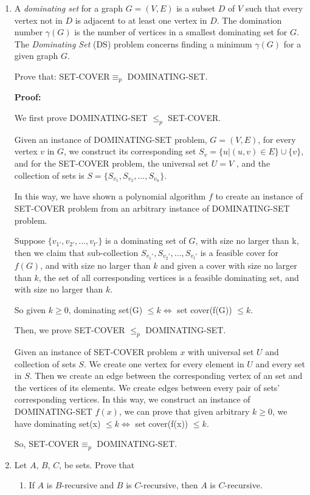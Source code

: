 \documentclass[12pt,a4paper]{article}
\theoremstyle{definition}
\numberwithin{equation}{section}
\numberwithin{figure}{section}
\begin{document}
\begin{enumerate}
  \item A \emph{dominating set} for a graph $G=(V,E)$ is a subset $D$ of $V$ such that every vertex not in $D$ is adjacent to at least one vertex in $D$. The domination number $\gamma(G)$ is the number of vertices in a smallest dominating set for $G$. The \emph{Dominating Set} (DS) problem concerns finding a minimum $\gamma(G)$ for a given graph $G$.

    Prove that: SET-COVER$\equiv_p$ DOMINATING-SET. 
    
    \textbf{Proof:}
    
    We first prove DOMINATING-SET $\leq_p $ SET-COVER.
    
Given an instance of DOMINATING-SET problem, $G = (V,E)$, for every vertex $v$ in $G$, we construct its corresponding set $S_v = \{u|(u, v) \in E\} \cup \{v\}$, and for the SET-COVER problem, the universal set $U = V$ , and the collection of sets is $S =\{S_{v_1} , S_{v_2} , . . . , S_{v_n} \}$.
    
In this way, we have shown a polynomial algorithm $f$ to create an instance of SET-COVER problem from an arbitrary instance of DOMINATING-SET problem.
 
Suppose $\{v_{1′},v_{2′},...,v_{t′}\}$ is a dominating set of $G$, with size no larger than k, then we claim that sub-collection ${S_{v_1′} , S_{v_2′} , . . . , S_{v_t′} }$ is a feasible cover for $f(G)$, and with size no larger than $k$ and given a cover with size no larger than $k$, the set of all corresponding vertices is a feasible dominating set, and with size no larger than $k$.
 
So given $k \geq 0$, dominating set(G) $\leq k \Leftrightarrow $ set cover(f(G)) $\leq k$.

Then, we prove SET-COVER $\leq_p$ DOMINATING-SET. 

Given an instance of SET-COVER problem $x$ with universal set $U$ and collection of sets $S$. We create one vertex for every element in $U$ and every set in $S$. Then we create an edge between the corresponding vertex of an set and the vertices of its elements. We create edges between every pair of sets’ corresponding vertices. In this way, we construct an instance of DOMINATING-SET $f(x)$, we can prove that given arbitrary $k \geq 0$, we have dominating set(x) $\leq k \Leftrightarrow $ set cover(f(x)) $\leq k$.

So, SET-COVER$\equiv_p$ DOMINATING-SET.

\item Let $A$, $B$, $C$, be sets. Prove that
\begin{enumerate}
\item If $A$ is $B$-recursive and $B$ is $C$-recursive, then $A$ is $C$-recursive.


\end{enumerate}
\end{enumerate}
\end{document}

